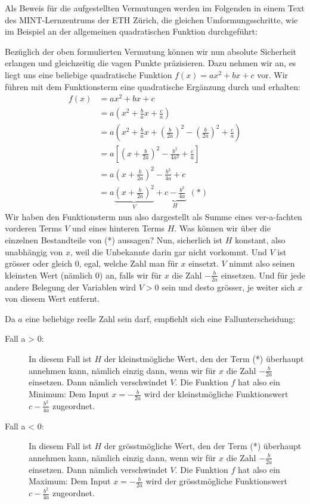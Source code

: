 \newpage

Als Beweis für die aufgestellten Vermutungen werden im Folgenden in einem Text des MINT-Lernzentrums der ETH Zürich, die gleichen Umformungsschritte, wie im Beispiel an der allgemeinen quadratischen Funktion durchgeführt:

Bezüglich der oben formulierten Vermutung können wir nun absolute Sicherheit erlangen und gleichzeitig die vagen Punkte präzisieren. Dazu nehmen wir an, es liegt uns eine beliebige quadratische Funktion $f(x)=ax^2+bx+c$ vor.
Wir führen mit dem Funktionsterm eine quadratische Ergänzung durch und erhalten:
\begin{align*}
    f(x) & =ax^2+bx+c                                                                                            \\
         & =a \left(x^2+\frac{b}{a} x+\frac{c}{a}\right)                                                         \\
         & =a \left(x^2+\frac{b}{a} x+\left(\frac{b}{2a}\right)^2-\left(\frac{b}{2a}\right)^2+\frac{c}{a}\right) \\
         & =a\left[\left(x+\frac{b}{2a}\right)^2-\frac{b^2}{4a^2}+\frac{c}{a}\right]                             \\
         & =a\left(x+\frac{b}{2a}\right)^2-\frac{b^2}{4a}+c                                                      \\
         & =a\underbrace{\left(x+\frac{b}{2a}\right)^2}_{V}+\underbrace{c-\frac{b^2}{4a}}_{H}\ \ (*)
\end{align*}
Wir haben den Funktionsterm nun also dargestellt als Summe eines ver-a-fachten vorderen Terms $V$ und eines hinteren Terms $H$. Was können wir über die einzelnen Bestandteile von (*) aussagen? Nun, sicherlich ist $H$ konstant, also unabhängig von $x$, weil die Unbekannte darin gar nicht vorkommt. Und $V$ ist grösser oder gleich $0$, egal, welche Zahl man für $x$ einsetzt. $V$ nimmt also seinen kleinsten Wert (nämlich $0$) an, falls wir für $x$ die Zahl $-\frac{b}{2a}$ einsetzen. Und für jede andere Belegung der Variablen wird $V > 0$ sein und desto grösser, je weiter sich $x$ von diesem Wert entfernt.

Da $a$ eine beliebige reelle Zahl sein darf, empfiehlt sich eine Fallunterscheidung:
\begin{description}
    \item[Fall a > 0:] 	In diesem Fall ist $H$ der kleinstmögliche Wert, den der Term (*) überhaupt annehmen kann, nämlich einzig dann, wenn wir für $x$ die Zahl $-\frac{b}{2a}$ einsetzen. Dann nämlich verschwindet $V$. Die Funktion $f$ hat also ein Minimum: Dem Input $x=-\frac{b}{2a}$ wird der kleinstmögliche Funktionswert $c-\frac{b^2}{4a}$ zugeordnet.
    \item[Fall a < 0:] In diesem Fall ist $H$ der grösstmögliche Wert, den der Term (*) überhaupt annehmen kann, nämlich einzig dann, wenn wir für $x$ die Zahl $-\frac{b}{2a}$ einsetzen. Dann nämlich verschwindet $V$. Die Funktion $f$ hat also ein Maximum: Dem Input $x=-\frac{b}{2a}$ wird der grösstmögliche Funktionswert $c-\frac{b^2}{4a}$ zugeordnet.
\end{description}

